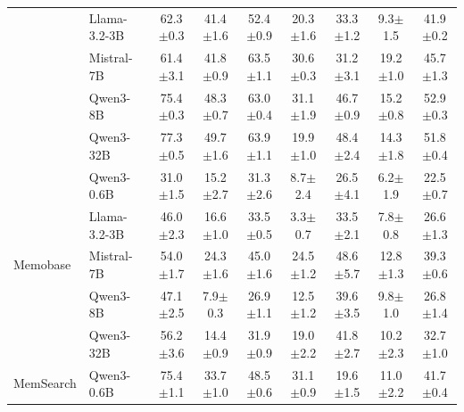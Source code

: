 \begin{table}[t]
\begin{tabular}{@{}ll cccccc c@{}}
  & Llama-3.2-3B   & 62.3{\scriptsize$\pm$0.3} & 41.4{\scriptsize$\pm$1.6} & 52.4{\scriptsize$\pm$0.9} & 20.3{\scriptsize$\pm$1.6} & 33.3{\scriptsize$\pm$1.2} & 9.3{\scriptsize$\pm$1.5} & 41.9{\scriptsize$\pm$0.2} \\

  & Mistral-7B     & 61.4{\scriptsize$\pm$3.1} & 41.8{\scriptsize$\pm$0.9} & 63.5{\scriptsize$\pm$1.1} & 30.6{\scriptsize$\pm$0.3} & 31.2{\scriptsize$\pm$3.1} & 19.2{\scriptsize$\pm$1.0} & 45.7{\scriptsize$\pm$1.3} \\

  & Qwen3-8B       & 75.4{\scriptsize$\pm$0.3} & 48.3{\scriptsize$\pm$0.7} & 63.0{\scriptsize$\pm$0.4} & 31.1{\scriptsize$\pm$1.9} & 46.7{\scriptsize$\pm$0.9} & 15.2{\scriptsize$\pm$0.8} & 52.9{\scriptsize$\pm$0.3} \\

  & Qwen3-32B      & 77.3{\scriptsize$\pm$0.5} & 49.7{\scriptsize$\pm$1.6} & 63.9{\scriptsize$\pm$1.1} & 19.9{\scriptsize$\pm$1.0} & 48.4{\scriptsize$\pm$2.4} & 14.3{\scriptsize$\pm$1.8} & 51.8{\scriptsize$\pm$0.4} \\
\midrule
\multirow{5}{*}{Memobase}
  & Qwen3-0.6B     & 31.0{\scriptsize$\pm$1.5} & 15.2{\scriptsize$\pm$2.7} & 31.3{\scriptsize$\pm$2.6} & 8.7{\scriptsize$\pm$2.4} & 26.5{\scriptsize$\pm$4.1} & 6.2{\scriptsize$\pm$1.9} & 22.5{\scriptsize$\pm$0.7} \\

  & Llama-3.2-3B   & 46.0{\scriptsize$\pm$2.3} & 16.6{\scriptsize$\pm$1.0} & 33.5{\scriptsize$\pm$0.5} & 3.3{\scriptsize$\pm$0.7} & 33.5{\scriptsize$\pm$2.1} & 7.8{\scriptsize$\pm$0.8} & 26.6{\scriptsize$\pm$1.3} \\

  & Mistral-7B     & 54.0{\scriptsize$\pm$1.7} & 24.3{\scriptsize$\pm$1.6} & 45.0{\scriptsize$\pm$1.6} & 24.5{\scriptsize$\pm$1.2} & 48.6{\scriptsize$\pm$5.7} & 12.8{\scriptsize$\pm$1.3} & 39.3{\scriptsize$\pm$0.6} \\

  & Qwen3-8B       & 47.1{\scriptsize$\pm$2.5} & 7.9{\scriptsize$\pm$0.3} & 26.9{\scriptsize$\pm$1.1} & 12.5{\scriptsize$\pm$1.2} & 39.6{\scriptsize$\pm$3.5} & 9.8{\scriptsize$\pm$1.0} & 26.8{\scriptsize$\pm$1.4} \\

  & Qwen3-32B      & 56.2{\scriptsize$\pm$3.6} & 14.4{\scriptsize$\pm$0.9} & 31.9{\scriptsize$\pm$0.9} & 19.0{\scriptsize$\pm$2.2} & 41.8{\scriptsize$\pm$2.7} & 10.2{\scriptsize$\pm$2.3} & 32.7{\scriptsize$\pm$1.0} \\
\midrule
\multirow{5}{*}{MemSearch}
  & Qwen3-0.6B     & 75.4{\scriptsize$\pm$1.1} & 33.7{\scriptsize$\pm$1.0} & 48.5{\scriptsize$\pm$0.6} & 31.1{\scriptsize$\pm$0.9} & 19.6{\scriptsize$\pm$1.5} & 11.0{\scriptsize$\pm$2.2} & 41.7{\scriptsize$\pm$0.4} \\


\end{tabular}
\end{table}
